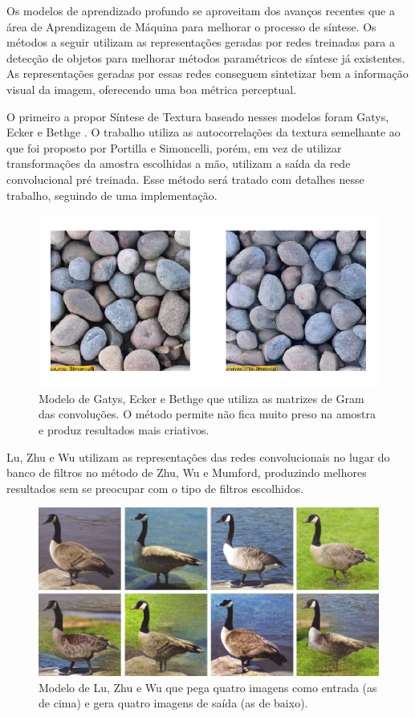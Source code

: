 Os modelos de aprendizado profundo se aproveitam
dos avanços recentes que a área de Aprendizagem
de Máquina para melhorar o processo de síntese.
Os métodos a seguir utilizam as representações
geradas por redes treinadas para a detecção
de objetos para melhorar métodos paramétricos
de síntese já existentes.
As representações geradas por essas
redes conseguem sintetizar bem a informação
visual da imagem, oferecendo uma boa
métrica perceptual.


O primeiro a propor Síntese
de Textura baseado nesses modelos foram
Gatys, Ecker e Bethge \cite{Gatys2015}.
O trabalho utiliza as autocorrelações
da textura semelhante ao que foi proposto
por Portilla e Simoncelli, porém, em
vez de utilizar transformações da amostra
escolhidas a mão, utilizam a saída da
rede convolucional pré treinada. 
Esse método será tratado com detalhes
nesse trabalho, seguindo de uma implementação.

\begin{figure}[!ht]
	\centering
	\includegraphics[width=\linewidth*2/3]{files/assets/articles/gatys1.png}
	\caption{Modelo de Gatys, Ecker e Bethge que
	utiliza as matrizes de Gram das convoluções.
	O método permite não fica muito preso na amostra
	e produz resultados mais criativos.}
	\label{img:preview}
\end{figure}


Lu, Zhu e Wu \cite{Lu2016}
utilizam as representações
das redes convolucionais
no lugar do banco de filtros
no método de Zhu, Wu e Mumford,
produzindo melhores resultados sem
se preocupar com o tipo de filtros
escolhidos.

\begin{figure}[!ht]
	\includegraphics[width=\linewidth]{files/assets/articles/lu.png}
	\caption{Modelo de Lu, Zhu e Wu que pega quatro imagens como
	entrada (as de cima) e gera quatro imagens de saída (as de baixo).}
	\label{img:preview}
\end{figure}



